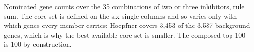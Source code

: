 \begin{table}[htbp]
\centering
\footnotesize
\caption[]{Nominated gene counts over the 35 combinations of two or three inhibitors, rule
sum. The core set is defined on the six single columns and so varies only with which
genes every member carries; Hoepfner covers 3,453 of the 3,587 background genes, which is
why the best-available core set is smaller. The composed top 100 is 100 by
construction.}
\label{tab:nominations}

\end{table}
